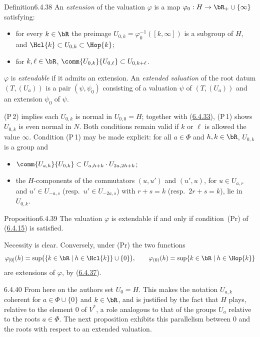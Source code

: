 \documentclass[12pt,a4paper,oneside,english]{smfart}
\makeatletter
\newcommand{\btanchor}[1]{\leavevmode\Hy@raisedlink{\hypertarget{bt:#1}{}}}
\newcommand{\btref}[1]{\hyperlink{bt:#1}{#1}}
\theoremstyle{definition}
\theoremstyle{bt}
\makeatother
\begin{document}
\begin{bt}{Definition}{6.4.38}\btanchor{6.4.38}
An \emph{extension} of the valuation $\varphi$ is a map
$\varphi_0:H\to\bR_{+}\cup\{\infty\}$ satisfying:
\begin{itemize}
\item[(P\,1)] for every $k\in\bR$ the preimage
  $U_{0,k}=\varphi_0^{-1}([k,\infty])$ is a subgroup of $H$, and
  $\Hcl{k}\subset U_{0,k}\subset \Hop{k}$;
\item[(P\,2)] for $k,\ell\in\bR$, $\comm{U_{0,k}}{U_{0,\ell}}\subset U_{0,k+\ell}$.
\end{itemize}
$\varphi$ is \emph{extendable} if it admits an extension. An
\emph{extended valuation} of the root datum $(T,(U_a))$ is a pair
$(\psi,\psi_0)$ consisting of a valuation $\psi$ of $(T,(U_a))$ and an
extension $\psi_0$ of $\psi$.
\end{bt}

\noindent
(P\,2) implies each $U_{0,k}$ is normal in $U_{0,0}=H$; together with
(\btref{6.4.33}), (P\,1) shows $U_{0,k}$ is even normal in $N$. Both conditions
remain valid if $k$ or $\ell$ is allowed the value $\infty$.
Condition (P\,1) may be made explicit: for all $a\in\Phi$ and
$h,k\in\bR$, $U_{0,k}$ is a group and
\begin{itemize}
\item[(P\,1$'$)] $\comm{U_{a,h}}{U_{0,k}}\subset U_{a,h+k}\cdot U_{2a,2h+k}$;
\item[(P\,1$''$)] the $H$-components of the commutators $(u,u')$ and
  $(u',u)$, for $u\in U_{a,r}$ and $u'\in U_{-a,s}$ (resp.\
  $u'\in U_{-2a,s}$) with $r+s=k$ (resp.\ $2r+s=k$), lie in $U_{0,k}$.
\end{itemize}

\begin{bt}{Proposition}{6.4.39}\btanchor{6.4.39}
The valuation $\varphi$ is extendable if and only if condition~(Pr) of
(\btref{6.4.15}) is satisfied.
\end{bt}

\begin{sketch}
Necessity is clear. Conversely, under (Pr) the two functions
\[
  \varphi_{[0]}(h)=\sup\bigl(\{k\in\bR\mid h\in \Hcl{k}\}\cup\{0\}\bigr),
  \qquad
  \varphi_{(0)}(h)=\sup\{k\in\bR\mid h\in \Hop{k}\}
\]
are extensions of $\varphi$, by (\btref{6.4.37}).
\end{sketch}

\begin{btpar}{6.4.40}
From here on the authors set $U_0=H$. This makes the notation $U_{a,k}$
coherent for $a\in\Phi\cup\{0\}$ and $k\in\bR$, and is justified by the
fact that $H$ plays, relative to the element $0$ of $V^{*}$, a role
analogous to that of the groups $U_a$ relative to the roots $a\in\Phi$.
The next proposition exhibits this parallelism between $0$ and the roots
with respect to an extended valuation.
\end{btpar}
\end{document}
